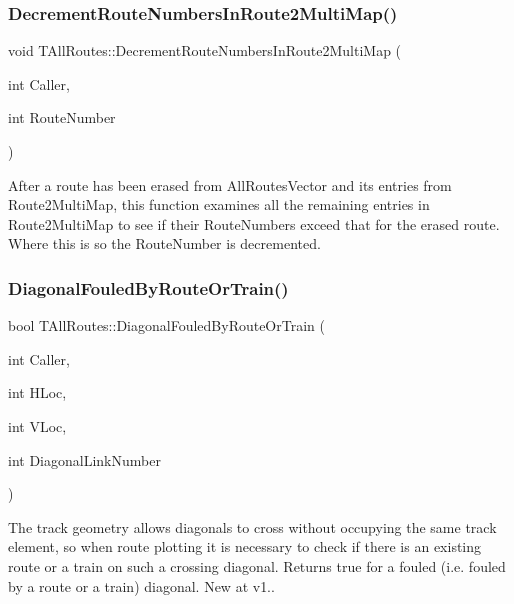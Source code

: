 \subsubsection{\texorpdfstring{Decrement\+Route\+Numbers\+In\+Route2\+Multi\+Map()}{DecrementRouteNumbersInRoute2MultiMap()}}
{\footnotesize\ttfamily void T\+All\+Routes\+::\+Decrement\+Route\+Numbers\+In\+Route2\+Multi\+Map (\begin{DoxyParamCaption}\item[{int}]{Caller,  }\item[{int}]{Route\+Number }\end{DoxyParamCaption})}

After a route has been erased from All\+Routes\+Vector and its entries from Route2\+Multi\+Map, this function examines all the remaining entries in Route2\+Multi\+Map to see if their Route\+Numbers exceed that for the erased route. Where this is so the Route\+Number is decremented. \mbox{\label{class_t_all_routes_a2341a7e860e716e60b733f45814e4499}} 
\subsubsection{\texorpdfstring{Diagonal\+Fouled\+By\+Route\+Or\+Train()}{DiagonalFouledByRouteOrTrain()}}
{\footnotesize\ttfamily bool T\+All\+Routes\+::\+Diagonal\+Fouled\+By\+Route\+Or\+Train (\begin{DoxyParamCaption}\item[{int}]{Caller,  }\item[{int}]{H\+Loc,  }\item[{int}]{V\+Loc,  }\item[{int}]{Diagonal\+Link\+Number }\end{DoxyParamCaption})}

The track geometry allows diagonals to cross without occupying the same track element, so when route plotting it is necessary to check if there is an existing route or a train on such a crossing diagonal. Returns true for a fouled (i.\+e. fouled by a route or a train) diagonal. New at v1.. \mbox{\label{class_t_all_routes_ac80a3ae43f749d401f470de711e8e4b0}} 
